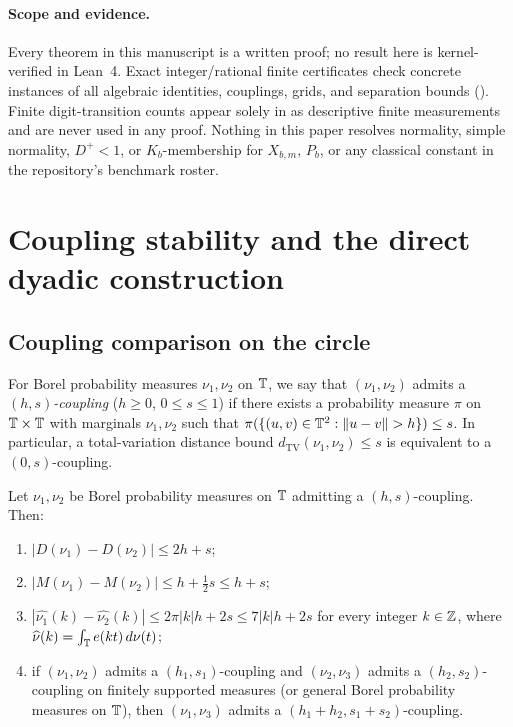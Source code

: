 \documentclass[11pt]{article}
\newcommand{\dist}[1]{\lVert #1\rVert}
\begin{document}
\paragraph{Scope and evidence.} Every theorem in this manuscript is a written proof; no result here is kernel-verified in Lean~4. Exact integer/rational finite certificates check concrete instances of all algebraic identities, couplings, grids, and separation bounds (). Finite digit-transition counts appear solely in  as descriptive finite measurements and are never used in any proof. Nothing in this paper resolves normality, simple normality, $D^+<1$, or $K_b$-membership for $X_{b,m}$, $P_b$, or any classical constant in the repository's benchmark roster.

\section{Coupling stability and the direct dyadic construction}\label{sec:dyadic}

\subsection{Coupling comparison on the circle}

For Borel probability measures $\nu_1,\nu_2$ on $\mathbb T$, we say that $(\nu_1,\nu_2)$ admits a \emph{$(h,s)$-coupling} ($h\ge0$, $0\le s\le1$) if there exists a probability measure $\pi$ on $\mathbb T\times\mathbb T$ with marginals $\nu_1,\nu_2$ such that $\pi(\{(u,v)\in\T^2:\dist{u-v}>h\})\le s$. In particular, a total-variation distance bound $d_{\mathrm{TV}}(\nu_1,\nu_2)\le s$ is equivalent to a $(0,s)$-coupling.

\begin{lemma}\label{lem:coupling}
Let $\nu_1,\nu_2$ be Borel probability measures on $\mathbb T$ admitting a $(h,s)$-coupling. Then:
\begin{enumerate}[label=\textup{(\alph*)},nosep]
\item $|D(\nu_1)-D(\nu_2)|\le 2h+s$;
\item $|M(\nu_1)-M(\nu_2)|\le h+\frac12 s\le h+s$;
\item $|\widehat{\nu_1}(k)-\widehat{\nu_2}(k)|\le 2\pi|k|h+2s\le 7|k|h+2s$ for every integer $k\in\mathbb Z$, where $\widehat{\nu}(k)=\int_{\mathbb T}e(kt)\,d\nu(t)$;
\item if $(\nu_1,\nu_2)$ admits a $(h_1,s_1)$-coupling and $(\nu_2,\nu_3)$ admits a $(h_2,s_2)$-coupling on finitely supported measures (or general Borel probability measures on $\mathbb T$), then $(\nu_1,\nu_3)$ admits a $(h_1+h_2,s_1+s_2)$-coupling.
\end{enumerate}
\end{lemma}
\end{document}

